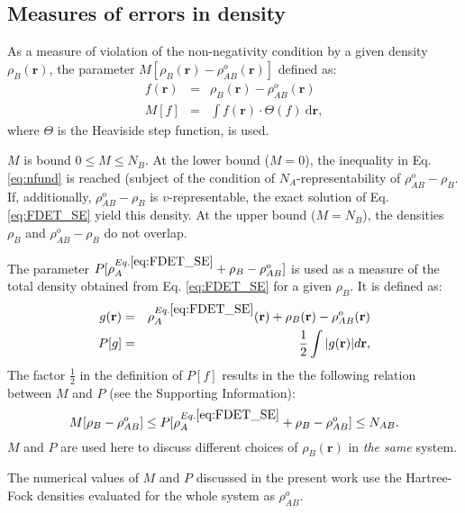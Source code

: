 \documentclass[journal=jctcce,manuscript=article]{achemso}
\begin{document}
\subsection{Measures of errors in density}
As a measure of violation of the non-negativity condition by a given density $\rho_{B}(\mathbf{r})$, the
 parameter $M[\rho_{B}(\mathbf{r})-\rho^{o}_{AB}(\mathbf{r})]$ defined as:
\begin{eqnarray}\label{eq:M}
f(\mathbf{r})&=&\rho_{B}(\mathbf{r})-\rho^{o}_{AB}(\mathbf{r}) \nonumber\\
 M[f] & = & \int f(\mathbf{r})\cdot \Theta(f) \ \mathrm{d}\mathbf{r}, \label{eq:def_M}
\end{eqnarray}
where $\Theta$ is the Heaviside step function, is used.

$M$ is bound $0 \le M\le N_{B}$. At the lower bound ($M=0$), the inequality in Eq. \ref{eq:nfund} is reached (subject of the condition of $N_A$-representability of $\rho^{o}_{AB}-\rho_{B}$. If, additionally,  $\rho^{o}_{AB}-\rho_{B}$ is $v$-representable, the exact solution of Eq. \ref{eq:FDET_SE} yield this density.  At the upper bound ($M=N_{B}$), the densities $\rho_{B}$ and $\rho^{o}_{AB}-\rho_{B}$ do not overlap.

The parameter $P[\rho_A^{Eq.\ref{eq:FDET_SE}}+\rho_B-\rho_{AB}^{o}]$ is used as a measure of the  total density obtained from Eq. \ref{eq:FDET_SE}
for a given $\rho_{B}$. It is defined as: 
\begin{eqnarray}
g(\mathbf{r})&=&\rho^{Eq.\ref{eq:FDET_SE}}_A(\mathbf{r})+ \rho_B(\mathbf{r}) - \rho_{AB}^{o}(\mathbf{r}) \nonumber\\
 P[g] &=& \frac{1}{2} 
 \int \vert g(\mathbf{r})  \vert d\mathbf{r}, \label{eq:def_P}
\end{eqnarray}
The factor  $\frac{1}{2}$ in the definition of $P[f]$ results in
the the following relation between $M$ and $P$ (see the Supporting Information):
\begin{equation} \label{eq:P_bound}
 M[\rho_{B} - \rho^{o}_{AB}] \leq P[\rho^{Eq.\ref{eq:FDET_SE}}_A+\rho_B - \rho_{AB}^{o}]  \leq %
  N_{AB}.
\end{equation} 
$M$ and $P$  are used here to discuss different choices of $\rho_{B}(\mathbf{r})$ in {\it the same} system. 

The numerical values of $M$ and $P$ discussed in the present work use the Hartree-Fock densities evaluated for the whole system  as $\rho^{o}_{AB}$. 
\end{document}
